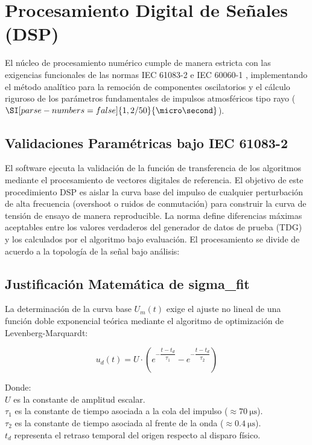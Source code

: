 \section{Procesamiento Digital de Señales (DSP)}
El núcleo de procesamiento numérico cumple de manera estricta con las exigencias funcionales de las normas IEC 61083-2 e IEC 60060-1 , implementando el método analítico para la remoción de componentes oscilatorios y el cálculo riguroso de los parámetros fundamentales de impulsos atmosféricos tipo rayo ($\SI[parse-numbers=false]{1,2/50}{\micro\second}$).

\subsection{Validaciones Paramétricas bajo IEC 61083-2}
El software ejecuta la validación de la función de transferencia de los algoritmos mediante el procesamiento de vectores digitales de referencia. El objetivo de este procedimiento DSP es aislar la curva base del impulso de cualquier perturbación de alta frecuencia (overshoot o ruidos de conmutación) para construir la curva de tensión de ensayo de manera reproducible.
La norma define diferencias máximas aceptables entre los valores verdaderos del generador de datos de prueba (TDG) y los calculados por el algoritmo bajo evaluación. El procesamiento se divide de acuerdo a la topología de la señal bajo análisis:

\subsection{Justificación Matemática de sigma\_fit}
La determinación de la curva base $U_m(t)$ exige el ajuste no lineal de una función doble exponencial teórica mediante el algoritmo de optimización de Levenberg-Marquardt:

\begin{equation}
    u_d(t) = U \cdot \left( e^{-\dfrac{t-t_d}{\tau_1}} - e^{-\dfrac{t-t_d}{\tau_2}} \right)
    \label{eq:DobleExponencial}
\end{equation}

Donde:\\
$U$ es la constante de amplitud escalar.\\
$\tau_1$ es la constante de tiempo asociada a la cola del impulso ($\approx \SI{70}{\micro\second}$).\\
$\tau_2$ es la constante de tiempo asociada al frente de la onda ($\approx \SI{0,4}{\micro\second}$).\\
$t_d$ representa el retraso temporal del origen respecto al disparo físico.

